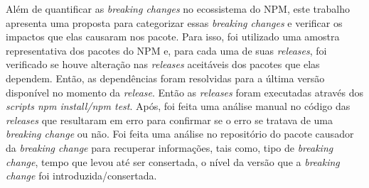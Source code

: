 Além de quantificar as \textit{breaking changes} no ecossistema do NPM, este trabalho apresenta uma proposta para categorizar essas \textit{breaking changes} e verificar os impactos que elas causaram nos pacote. Para isso, foi utilizado uma amostra representativa dos pacotes do NPM e, para cada uma de suas \textit{releases}, foi verificado se houve alteração nas \textit{releases} aceitáveis dos pacotes que elas dependem. Então, as dependências foram resolvidas para a última versão disponível no momento da \textit{release}. Então as \textit{releases} foram executadas através dos \textit{scripts npm install/npm test}. Após, foi feita uma análise manual no código das \textit{releases} que resultaram em erro para confirmar se o erro se tratava de uma \textit{breaking change} ou não. Foi feita uma análise no repositório do pacote causador da \textit{breaking change} para recuperar informações, tais como, tipo de \textit{breaking change}, tempo que levou até ser consertada, o nível da versão que a \textit{breaking change} foi introduzida/consertada.


